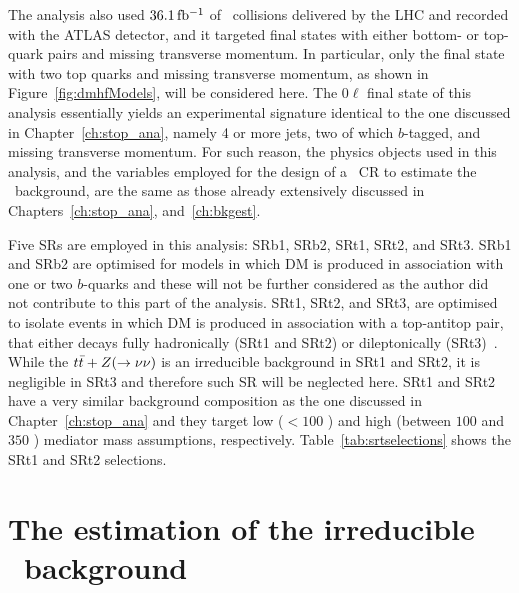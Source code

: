 		The analysis also used $36.1\, \mbox{fb$^{-1}$}$ of \pp\ collisions delivered by the \ac{LHC} and recorded with the \ac{ATLAS} detector, and it targeted final states with either bottom- or top-quark pairs and missing transverse momentum. In particular, only the final state with two top quarks and missing transverse momentum, as shown in Figure~\ref{fig:dmhfModels}, will be considered here. The $0\ell$ final state of this analysis essentially yields an experimental signature identical to the one discussed in Chapter~\ref{ch:stop_ana}, namely 4 or more jets, two of which $b$-tagged, and missing transverse momentum. For such reason, the physics objects used in this analysis, and the variables employed for the design of a \ttgamma\ \ac{CR} to estimate the \ttZ\ background, are the same as those already extensively discussed in Chapters~\ref{ch:stop_ana}, and~\ref{ch:bkgest}. 

		Five \acp{SR} are employed in this analysis: SRb1, SRb2, SRt1, SRt2, and SRt3. SRb1 and SRb2 are optimised for models in which \ac{DM} is produced in association with one or two $b$-quarks and these will not be further considered as the author did not contribute to this part of the analysis. SRt1, SRt2, and SRt3, are optimised to isolate events in which \ac{DM} is produced in association with a top-antitop pair, that either decays fully hadronically (SRt1 and SRt2) or dileptonically (SRt3)~\cite{DMhf}. While the $t\bar{t}+Z(\rightarrow \nu\nu)$ is an irreducible background in SRt1 and SRt2, it is negligible in SRt3 and therefore such \ac{SR} will be neglected here. SRt1 and SRt2 have a very similar background composition as the one discussed in Chapter~\ref{ch:stop_ana} and they target low ($< 100$ \GeV) and high (between $100$ and $350$ \GeV) mediator mass assumptions, respectively. 
		Table~\ref{tab:srtselections} shows the SRt1 and SRt2 selections.%


	\section{The estimation of the irreducible \ttZ\ background}

